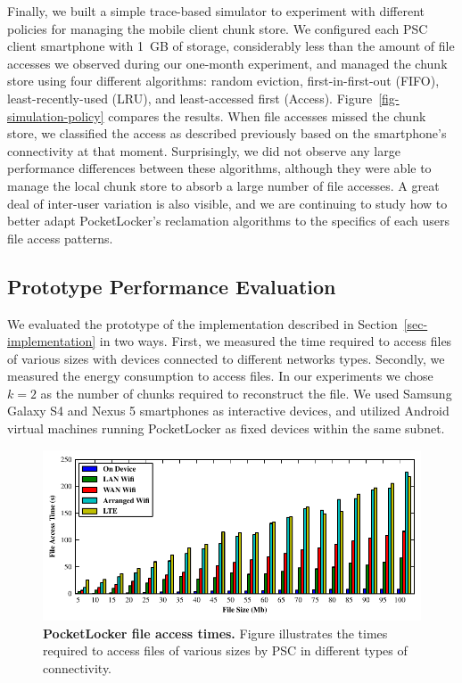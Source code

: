 Finally, we built a simple trace-based simulator to experiment with different
policies for managing the mobile client chunk store. We configured each PSC
client smartphone with 1~GB of storage, considerably less than the amount of
file accesses we observed during our one-month experiment, and managed the
chunk store using four different algorithms: random eviction,
first-in-first-out (FIFO), least-recently-used (LRU), and least-accessed
first (Access). Figure~\ref{fig-simulation-policy} compares the results. When
file accesses missed the chunk store, we classified the access as described
previously based on the smartphone's connectivity at that moment.
Surprisingly, we did not observe any large performance differences between
these algorithms, although they were able to manage the local
chunk store to absorb a large number of file accesses. A great
deal of inter-user variation is also visible, and we are continuing to study
how to better adapt PocketLocker's reclamation algorithms to the specifics of
each users file access patterns.

\subsection{Prototype Performance Evaluation}
We evaluated the prototype of the implementation described in
Section~\ref{sec-implementation} in two ways. First, we
measured the time required to access files of various sizes with devices
connected to different networks types. Secondly, we measured
the energy consumption to access files. In our experiments we chose $k=2$ as
the number of chunks required to reconstruct the file. We used Samsung Galaxy
S4 and Nexus 5 smartphones as interactive devices, and utilized Android virtual machines
running PocketLocker as fixed devices within the same subnet.
\begin{figure}[t]

  \includegraphics[width=\textwidth]{./figures/downloadtimes.pdf}

  \caption{\small \textbf{PocketLocker file access times.} Figure
    illustrates the
    times required to access files of various sizes by PSC in different
    types of
  connectivity.}

  \label{fig-evaluation-download}

\end{figure}


